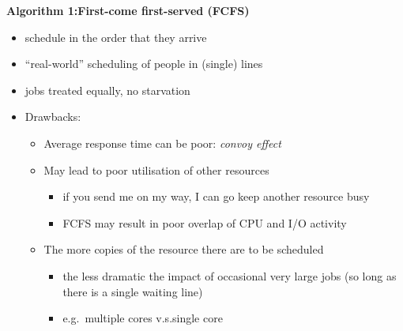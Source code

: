 \documentclass[11pt,a4paper]{article}
\begin{document}
\textbf{Algorithm 1:\@ First-come first-served (FCFS)} \\
\begin{itemize}
    \item schedule in the order that they arrive
    \item ``real-world'' scheduling of people in (single) lines
    \item jobs treated equally, no starvation
    \item Drawbacks:
        \begin{itemize}
            \item Average response time can be poor: \emph{convoy effect}
            \item May lead to poor utilisation of other resources
                \begin{itemize}
                    \item if you send me on my way, I can go keep another resource busy
                    \item FCFS may result in poor overlap of CPU and I/O activity
                \end{itemize}
            \item The more copies of the resource there are to be scheduled
                \begin{itemize}
                    \item the less dramatic the impact of occasional very large jobs
                        (so long as there is a single waiting line)
                    \item e.g.\ multiple cores v.s.\@ single core
                \end{itemize}
        \end{itemize}
\end{itemize}
\end{document}
